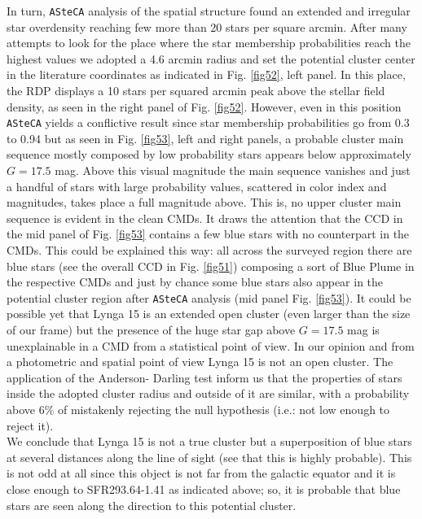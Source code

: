 \documentclass[draft]{aa}
\begin{document}
In turn, \texttt{ASteCA} analysis of the spatial structure found an extended and
irregular star overdensity reaching few more than 20 stars per square arcmin.
After many attempts to look for the place where the star membership
probabilities reach the highest values we adopted a 4.6 arcmin radius and set
the potential cluster center in the literature coordinates as indicated in Fig.
\ref{fig52}, left panel. In this place, the RDP displays a 10 stars per squared
arcmin peak above the stellar field density, as seen in the right panel of Fig. 
\ref{fig52}.
However, even in this position \texttt{ASteCA} yields a conflictive result
since star membership probabilities go from 0.3 to 0.94 but as seen in Fig. 
\ref{fig53}, left and right panels, a probable cluster main sequence mostly
composed by low probability stars appears below approximately $G=17.5$ mag.
Above this visual magnitude the main sequence vanishes and just a handful of
stars with large probability values, scattered in color index and magnitudes,
takes place a full magnitude above. This is, no upper cluster main sequence is
evident in the clean CMDs. It draws the attention that the CCD in the mid panel
of Fig. \ref{fig53} contains a few blue stars with no counterpart in the CMDs.
This could be explained this way: all across the surveyed region there are blue
stars (see the overall CCD in Fig. \ref{fig51}) composing a sort of Blue Plume
in the respective CMDs and just by chance some blue stars also appear in the
potential cluster region after \texttt{ASteCA} analysis (mid panel Fig. 
\ref{fig53}). It could be possible yet that Lynga 15 is an
extended open cluster (even larger than the size of our frame) but the presence
of the huge star gap above $G=17.5$ mag is unexplainable in a CMD from a
statistical point of view. In our opinion and from a photometric and spatial
point of view Lynga 15 is not an open cluster. The application of the Anderson-
Darling test inform us that the properties of stars inside the adopted cluster
radius and outside of it are similar, with a probability above 6\% of
mistakenly rejecting the null hypothesis (i.e.: not low enough to reject it).\\

We conclude that Lynga 15 is not a true cluster but a superposition of blue
stars at several distances along the line of sight (see that this is highly
probable). This is not odd at all since this object is not
far from the galactic equator and it is close enough to SFR293.64-1.41 as
indicated above; so, it is probable that blue stars are seen along the direction
to this potential cluster.
\end{document}
